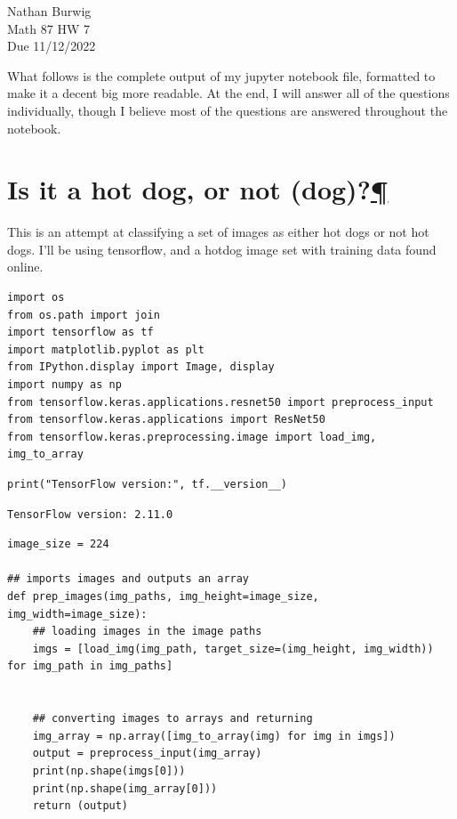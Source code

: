 \documentclass[
]{article}
\begin{document}
\noindent Nathan Burwig \\
Math 87 HW 7 \\
Due 11/12/2022
    
\hrulefill

What follows is the complete output of my jupyter notebook file, formatted to
make it a decent big more readable. At the end, I will answer all of the
questions individually, though I believe most of the questions are answered
throughout the notebook.

\hypertarget{Is-it-a-hot-dogux2c-or-not-ux28dogux29ux3f}{%
\section{\texorpdfstring{Is it a hot dog, or not
(dog)?\protect\hyperlink{Is-it-a-hot-dogux2c-or-not-ux28dogux29ux3f}{¶}}{Is it a hot dog, or not (dog)?¶}}\label{Is-it-a-hot-dogux2c-or-not-ux28dogux29ux3f}}

This is an attempt at classifying a set of images as either hot dogs or
not hot dogs. I'll be using tensorflow, and a hotdog image set with
training data found online.


\begin{Verbatim}[frame=single]
import os
from os.path import join
import tensorflow as tf
import matplotlib.pyplot as plt
from IPython.display import Image, display
import numpy as np
from tensorflow.keras.applications.resnet50 import preprocess_input
from tensorflow.keras.applications import ResNet50
from tensorflow.keras.preprocessing.image import load_img, img_to_array
\end{Verbatim}


\begin{Verbatim}[frame=single]
print("TensorFlow version:", tf.__version__)
\end{Verbatim}

\begin{verbatim}
TensorFlow version: 2.11.0
\end{verbatim}


\begin{Verbatim}[frame=single]
image_size = 224

## imports images and outputs an array
def prep_images(img_paths, img_height=image_size, img_width=image_size):
    ## loading images in the image paths
    imgs = [load_img(img_path, target_size=(img_height, img_width)) for img_path in img_paths]


    ## converting images to arrays and returning
    img_array = np.array([img_to_array(img) for img in imgs])
    output = preprocess_input(img_array)
    print(np.shape(imgs[0]))
    print(np.shape(img_array[0]))
    return (output)
\end{Verbatim}
\end{document}
